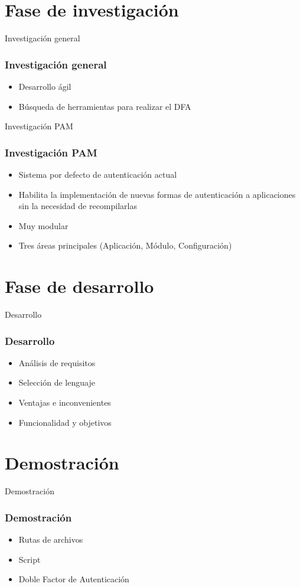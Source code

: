 \documentclass{beamer}
\begin{document}
\section{Fase de investigación}
\begin{frame}{Investigación general}
	\frametitle{Investigación general}
	\begin{itemize}
		\item Desarrollo ágil
		\vspace{0.7cm}
		\item Búsqueda de herramientas para realizar el DFA
	\end{itemize}
\end{frame}
\begin{frame}{Investigación PAM}
	\frametitle{Investigación PAM}
	\begin{itemize}
		\item Sistema por defecto de autenticación actual
		\vspace{0.7cm}
		\item Habilita la implementación de nuevas formas de autenticación a aplicaciones sin la necesidad de recompilarlas
		\vspace{0.7cm}
		\item Muy modular
		\vspace{0.7cm}
		\item Tres áreas principales (Aplicación, Módulo, Configuración)
	\end{itemize}
\end{frame}
\section{Fase de desarrollo}
\begin{frame}{Desarrollo}
	\frametitle{Desarrollo}
	\begin{itemize}
		\item Análisis de requisitos
		\vspace{0.7cm}
		\item Selección de lenguaje
		\vspace{0.7cm}
		\item Ventajas e inconvenientes
		\vspace{0.7cm}
		\item Funcionalidad y objetivos
	\end{itemize}
\end{frame}
\section{Demostración}
\begin{frame}{Demostración}
	\frametitle{Demostración}
	\begin{itemize}
		\item Rutas de archivos
		\vspace{0.7cm}
		\item Script
		\vspace{0.7cm}
		\item Doble Factor de Autenticación
	\end{itemize}
\end{frame}
\end{document}
